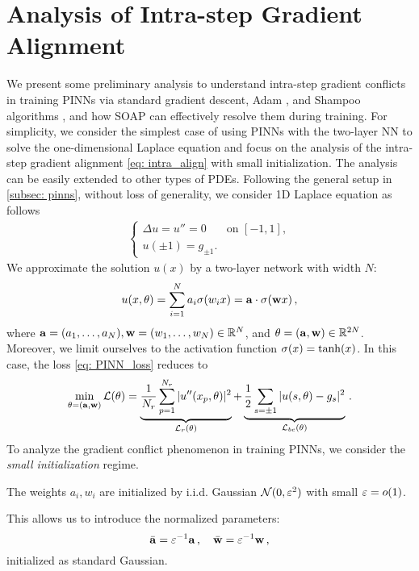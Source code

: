 \section{Analysis of Intra-step Gradient Alignment}  \label{sec:gradientconflict}
We present some preliminary analysis to understand intra-step gradient conflicts in training PINNs via standard gradient descent, Adam \cite{kingma2014adam}, and Shampoo algorithms \cite{gupta2018shampoo}, and how SOAP can effectively resolve them during training. For simplicity, we consider the simplest case of using PINNs with the two-layer NN to solve the one-dimensional Laplace equation and 
focus on the analysis of the intra-step gradient alignment \eqref{eq: intra_align} 
with small initialization. The analysis can be easily extended to other types of PDEs. 
Following the general setup in \cref{subsec: pinns}, without loss of generality, we consider 1D Laplace equation as follows
\begin{align}
    \left\{
\begin{array}{ll}
\Delta u = u'' = 0 & \text{on } [-1,1], \\
u(\pm 1) = g_{\pm 1}. & 
\end{array}
\right.
\end{align}
We approximate the solution $u(x)$ by a two-layer network with width $N$: 
\begin{equation} 
\label{eq:twolayersol}
    u(x, \theta) = \sum_{i = 1}^N a_i \sigma ( w_i x) = \mathbf{a} \cdot \sigma(\mathbf{w} x)\,,
\end{equation}
where $\mathbf{a} = (a_1, \ldots, a_N), \mathbf{w} = (w_1, \ldots, w_N)  \in \mathbb{R}^N$, and $\theta = (\mathbf{a},\mathbf{w}) \in \mathbb{R}^{2N}$. Moreover, we limit ourselves to the activation function $\sigma(x) = \tanh(x)$. In this case, the loss \eqref{eq: PINN_loss} reduces to 
\begin{equation} \label{eq:losseg}
    \min_{\theta = (\mathbf{a}, \mathbf{w})} \mathcal{L}(\theta) = \underbrace{\frac{1}{N_r} \sum_{p = 1}^{N_r} |u''(x_p, \theta)|^2}_{\mathcal{L}_{r}(\theta)} + \underbrace{\frac{1}{2} \sum_{s = \pm 1} |u(s, \theta) - g_{s}|^2}_{\mathcal{L}_{bc}(\theta)}\,.
\end{equation}
To analyze the gradient conflict phenomenon in training PINNs, we consider the \emph{small initialization} regime. 
\begin{assumption} \label{assp1}
    The weights $a_i, w_i$ are initialized by i.i.d. Gaussian $\mathcal{N}(0,\varepsilon^2)$ with small $\varepsilon = o(1)$. 
\end{assumption}
This allows us to introduce the normalized parameters:  
\begin{equation*}
    \bar{\mathbf{a}} = \varepsilon^{-1} \mathbf{a}\,, \quad \bar{\mathbf{w}} = \varepsilon^{-1} \mathbf{w}\,, 
\end{equation*}
initialized as standard Gaussian.

